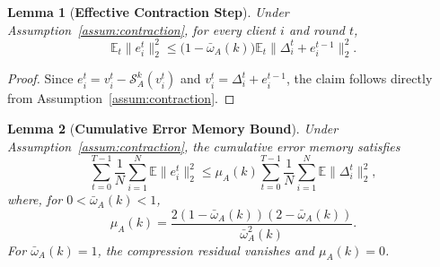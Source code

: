 \documentclass[journal]{IEEEtran}
\newtheorem{lemma}{Lemma}
\begin{document}
\begin{lemma}[\bf Effective Contraction Step]
    \label{lemma:topk}
    Under Assumption~\ref{assum:contraction}, for every client $i$ and round $t$,
    \begin{equation}
        \mathbb{E}_t\|e_i^t\|_2^2
        \le
        \big(1-\bar{\omega}_A(k)\big)
        \mathbb{E}_t\|\Delta_i^t+e_i^{t-1}\|_2^2.
    \end{equation}
\end{lemma}
\begin{proof}
    Since $e_i^t=v_i^t-\mathcal{S}_A^k(v_i^t)$ and $v_i^t=\Delta_i^t+e_i^{t-1}$, the claim follows directly from Assumption~\ref{assum:contraction}.
\end{proof}

\begin{lemma}[\bf Cumulative Error Memory Bound]
    \label{lemma:error_bound}
    Under Assumption~\ref{assum:contraction}, the cumulative error memory satisfies
    \begin{equation}
        \sum_{t=0}^{T-1}\frac1N\sum_{i=1}^{N}\mathbb{E}\|e_i^t\|_2^2
        \le
        \mu_A(k)
        \sum_{t=0}^{T-1}\frac1N\sum_{i=1}^{N}\mathbb{E}\|\Delta_i^t\|_2^2,
    \end{equation}
    where, for $0<\bar{\omega}_A(k)<1$,
    \begin{equation}
        \label{eqn:mu_def}
        \mu_A(k)
        =\frac{2(1-\bar{\omega}_A(k))(2-\bar{\omega}_A(k))}{\bar{\omega}_A^2(k)}.
    \end{equation}
    For $\bar{\omega}_A(k)=1$, the compression residual vanishes and $\mu_A(k)=0$.
\end{lemma}
\end{document}
